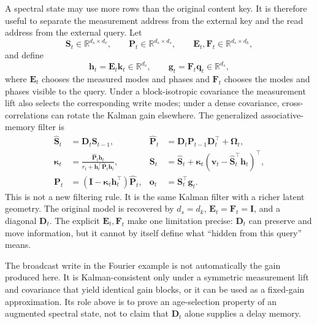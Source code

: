 \documentclass[11pt]{article}
\newcommand{\R}{\mathbb{R}}
\newcommand{\ve}[1]{\boldsymbol{#1}}
\newcommand{\tr}{\intercal}
\newcommand{\I}{\ve{I}}
\begin{document}
A spectral state may use more rows than the original content key. It is therefore useful to
separate the measurement address from the external key and the read address from the external
query. Let
\begin{equation}
  \ve{S}_t\in\R^{d_s\times d_v},
  \qquad
  \ve{P}_t\in\R^{d_s\times d_s},
  \qquad
  \ve{E}_t,\ve{F}_t\in\R^{d_s\times d_k},
\end{equation}
and define
\begin{equation}
  \ve{h}_t=\ve{E}_t\ve{k}_t\in\R^{d_s},
  \qquad
  \ve{g}_t=\ve{F}_t\ve{q}_t\in\R^{d_s},
\end{equation}
where $\ve{E}_t$ chooses the measured modes and phases and $\ve{F}_t$ chooses the modes and
phases visible to the query. Under a block-isotropic covariance the measurement lift also
selects the corresponding write modes; under a dense covariance, cross-correlations can rotate
the Kalman gain elsewhere. The generalized associative-memory filter is
\begin{align}
  \widehat{\ve{S}}_t
    &=\ve{D}_t\ve{S}_{t-1},
  &
  \widehat{\ve{P}}_t
    &=\ve{D}_t\ve{P}_{t-1}\ve{D}_t^{\tr}+\ve{\Omega}_t,
  \label{eq:spectral-kalman-predict}\\
  \ve{\kappa}_t
    &=\frac{\widehat{\ve{P}}_t\ve{h}_t}
      {r_t+\ve{h}_t^{\tr}\widehat{\ve{P}}_t\ve{h}_t},
  &
  \ve{S}_t
    &=\widehat{\ve{S}}_t+\ve{\kappa}_t
      (\ve{v}_t-\widehat{\ve{S}}_t^{\tr}\ve{h}_t)^{\tr},
  \label{eq:spectral-kalman-update}\\
  \ve{P}_t
    &=(\I-\ve{\kappa}_t\ve{h}_t^{\tr})\widehat{\ve{P}}_t,
  &
  \ve{o}_t&=\ve{S}_t^{\tr}\ve{g}_t.
  \label{eq:spectral-kalman-read}
\end{align}
This is not a new filtering rule. It is the same Kalman filter with a richer latent geometry.
The original model is recovered by $d_s=d_k$, $\ve{E}_t=\ve{F}_t=\I$, and a diagonal
$\ve{D}_t$. The explicit $\ve{E}_t,\ve{F}_t$ make one limitation precise: $\ve{D}_t$ can
preserve and move information, but it cannot by itself define what ``hidden from this query''
means.

The broadcast write in the Fourier example is not automatically the gain produced here.
It is Kalman-consistent only under a symmetric measurement lift and covariance that yield
identical gain blocks, or it can be used as a fixed-gain approximation. Its role above is to
prove an age-selection property of an augmented spectral state, not to claim that $\ve{D}_t$
alone supplies a delay memory.
\end{document}
